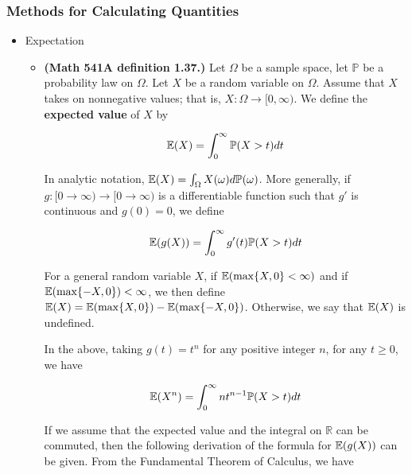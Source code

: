 \subsubsection{Methods for Calculating Quantities}

\begin{itemize}

\item Expectation

\begin{itemize}

\item \begin{definition}\label{prob.541a.exp.def} \textbf{(Math 541A definition 1.37.)} Let \(\Omega\) be a sample space, let \(\mathbb{P}\) be a probability law on \(\Omega\). Let \(X\) be a random variable on \(\Omega\). Assume that \(X\) takes on nonnegative values; that is, \(X: \Omega \to [0, \infty)\). We define the \textbf{expected value} of \(X\) by

\[
\E(X) = \int_0^\infty \mathbb{P}(X > t) dt
\]

In analytic notation, \(\E(X) = \int_{\Omega} X(\omega) d \mathbb{P}(\omega)\). More generally, if \(g: [0 \to \infty) \to [0 \to \infty)\) is a differentiable function such that \(g'\) is continuous and \(g(0)= 0\), we define

\[
\E(g(X)) = \int_0^\infty g'(t) \mathbb{P}(X > t) dt
\]

For a general random variable \(X\), if \(\E(\max \{X, 0\} < \infty)\) and if \(\E(\max \{-X, 0\}) < \infty\), we then define \(\E(X) = \E(\max \{X,0\}) - \E(\max\{-X,0\})\). Otherwise, we say that \(\E(X)\) is undefined.

\end{definition}

\begin{definition}\label{prob.def.power.exp} In the above, taking \(g(t)= t^n\) for any positive integer \(n\), for any \(t \geq 0\), we have

\[
\E(X^n) = \int_0^\infty nt^{n-1} \mathbb{P}(X > t) dt
\]

\end{definition}

\begin{remark} If we assume that the expected value and the integral on \(\mathbb{R}\) can be commuted, then the following derivation of the formula for \(\E(g(X))\) can be given. From the Fundamental Theorem of Calculus, we have


\end{remark}
\end{itemize}
\end{itemize}
